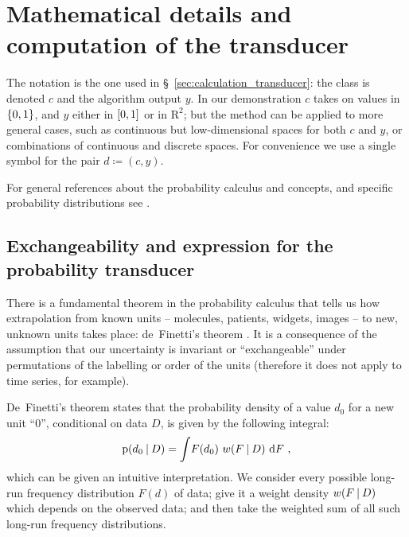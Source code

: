 \documentclass[\ifafour a4paper,12pt,\else a5paper,10pt,\fi%
onecolumn,oneside,article,%
british%
]{memoir}
\theoremstyle{remark}
\theoremstyle{innote}
\newcommand*{\di}{\mathrm{d}}%
\newcommand*{\RR}{\bm{\mathrm{R}}}
\newcommand*{\defd}{\coloneqq}
\DeclarePairedDelimiter\clcl{[}{]}
\DeclarePairedDelimiter\set{\{}{\}} %
\newcommand*{\p}{\mathrm{p}}%
\renewcommand*{\|}[1][]{\nonscript\:#1\vert\nonscript\:\mathopen{}}
\newcommand*{\sect}{\S}%
\newcommand*{\chap}{ch.}%
\newcommand*{\wf}{w}
\begin{document}
\bigskip

\section{Mathematical details and computation of the transducer}
\label{sec:maths_transducer}

The notation is the one used in \sect~\ref{sec:calculation_transducer}: the class is denoted $c$ and the algorithm output $y$. In our demonstration $c$ takes on values in $\set{0,1}$, and $y$ either in $\clcl{0,1}$ or in $\RR^{2}$; but the method can be applied to more general cases, such as continuous but low-dimensional spaces for both $c$ and $y$, or combinations of continuous and discrete spaces. For convenience we use a single symbol for the pair $d \defd (c, y)$.

For general references about the probability calculus and concepts, and specific probability distributions see \cites{jaynes1994_r2003,mackay1995_r2005,jeffreys1939_r1983,gregory2005,bernardoetal1994_r2000,hailperin1996,johnsonetal1969_r1996,johnsonetal1969b_r2005,johnsonetal1970_r1994,johnsonetal1970b_r1995,kotzetal1972_r2000}.

\subsection{Exchangeability and expression for the probability transducer}
\label{sec:deFinetti}



There is a fundamental theorem in the probability calculus that tells us how extrapolation from known units -- molecules, patients, widgets, images -- to new, unknown units takes place: de~Finetti's theorem \autocites[\chap~4]{bernardoetal1994_r2000}{dawid2013,definetti1929,definetti1937}. It is a consequence of the assumption that our uncertainty is invariant or \enquote{exchangeable} under permutations of the labelling or order of the units (therefore it does not apply to time series, for example).

De~Finetti's theorem states that the probability density of a value $d_{0}$ for a new unit \enquote{0}, conditional on data $D$, is given by the following integral:
\begin{equation}
  \label{eq:prob_is_expe_freq}
  \p(d_{0} \| D) = \int\! F(d_{0})\ \wf(F \| D)\ \di F \ ,
\end{equation}
which can be given an intuitive interpretation. We consider every possible long-run frequency distribution $F(d)$ of data; give it a weight density $\wf(F \| D)$ which depends on the observed data; and then take the weighted sum of all such long-run frequency distributions.
\end{document}
